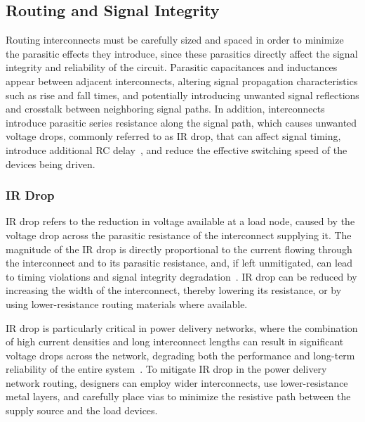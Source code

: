 \subsection{Routing and Signal Integrity}\label{sec:routing_si} %

Routing interconnects must be carefully sized and spaced in order to minimize the parasitic effects they introduce, since these parasitics directly affect the signal integrity and reliability of the circuit. Parasitic capacitances and inductances appear between adjacent interconnects, altering signal propagation characteristics such as rise and fall times, and potentially introducing unwanted signal reflections and crosstalk between neighboring signal paths. In addition, interconnects introduce parasitic series resistance along the signal path, which causes unwanted voltage drops, commonly referred to as IR drop, that can affect signal timing, introduce additional RC delay~\cite{layout_fundamentals,bogatin_SI}, and reduce the effective switching speed of the devices being driven.

\subsubsection{IR Drop}\label{sec:ir_drop}

IR drop refers to the reduction in voltage available at a load node, caused by the voltage drop across the parasitic resistance of the interconnect supplying it. The magnitude of the IR drop is directly proportional to the current flowing through the interconnect and to its parasitic resistance, and, if left unmitigated, can lead to timing violations and signal integrity degradation~\cite{layout_fundamentals}. IR drop can be reduced by increasing the width of the interconnect, thereby lowering its resistance, or by using lower-resistance routing materials where available.

IR drop is particularly critical in power delivery networks, where the combination of high current densities and long interconnect lengths can result in significant voltage drops across the network, degrading both the performance and long-term reliability of the entire system~\cite{dally_poulton_1998}. To mitigate IR drop in the power delivery network routing, designers can employ wider interconnects, use lower-resistance metal layers, and carefully place vias to minimize the resistive path between the supply source and the load devices.

